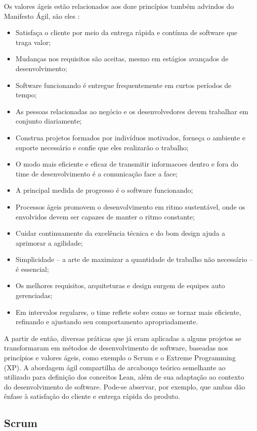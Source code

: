 Os valores ágeis estão relacionados aos doze princípios também advindos do Manifesto Ágil, são eles \cite{manifesto}:
\begin{itemize}
\item Satisfaça o cliente por meio da entrega rápida e contínua de software que traga valor;
\item Mudanças nos requisitos são aceitas, mesmo em estágios avançados de desenvolvimento;
\item Software funcionando é entregue frequentemente em curtos períodos de tempo;
\item As pessoas relacionadas ao negócio e os desenvolvedores devem trabalhar em conjunto diariamente;
\item Construa projetos formados por indivíduos motivados, forneça o ambiente e suporte necessário e confie que eles realizarão o trabalho;
\item O modo mais eficiente e eficaz de transmitir informacoes dentro e fora do time de desenvolvimento é a comunicação face a face;
\item A principal medida de progresso é o software funcionando;
\item Processos ágeis promovem o desenvolvimento em ritmo sustentável, onde os envolvidos devem ser capazes de manter o ritmo constante;
\item Cuidar continuamente da excelência técnica e do bom design ajuda a aprimorar a agilidade;
\item Simplicidade – a arte de maximizar a quantidade de trabalho não necessário – é essencial;
\item Os melhores requisitos, arquiteturas e design surgem de equipes auto gerenciadas;
\item Em intervalos regulares, o time reflete sobre como se tornar mais eficiente, refinando e ajustando seu comportamento apropriadamente.
\end{itemize}

A partir de então, diversas práticas que já eram aplicadas a alguns projetos se transformaram em métodos de desenvolvimento de software, baseadas nos princípios e valores ágeis, como exemplo o Scrum e o Extreme Programming (XP). A abordagem ágil compartilha de arcabouço teórico semelhante ao utilizado para definição dos conceitos Lean, além de sua adaptação ao contexto do desenvolvimento de software. Pode-se abservar, por exemplo, que ambas dão ênfase à satisfação do cliente e entrega rápida do produto.

\subsection[Scrum]{Scrum}

